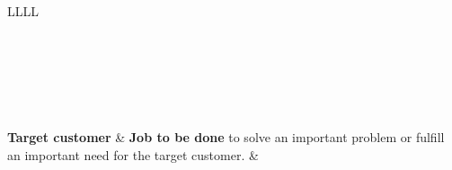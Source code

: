 \begin{longtable}{L{\column}L{\column}L{\column}L{\column}}
	
	\caption[Business Model Conceptualization]{Business Model Conceptualization adapted from \citet[p. 54]{Johnson2008}}
	\label{bm:concept}\\
	
	\toprule
	\endfirsthead
	\toprule
	\\ 
	\midrule
	\endhead
	\\
	\bottomrule
	\endfoot
	\bottomrule
	\endlastfoot
	
	\\ \midrule
	
	\textbf{\footnotesize Target customer} &
	\footnotesize \textbf{Job to be done} to solve an important problem or fulfill an important need for the target customer. &
	 \\ \midrule


\end{longtable}
